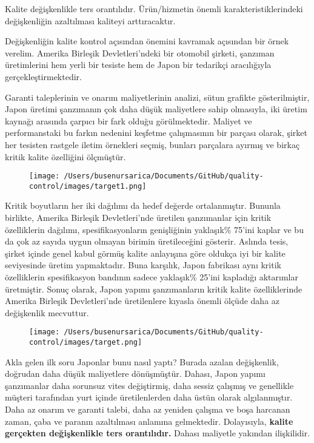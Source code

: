 \documentclass[
]{book}
\begin{document}
Kalite değişkenlikle ters orantılıdır. Ürün/hizmetin önemli karakteristiklerindeki değişkenliğin azaltılması kaliteyi arttıracaktır.

Değişkenliğin kalite kontrol açısından önemini kavramak açısından bir örnek verelim. Amerika Birleşik Devletleri'ndeki bir otomobil şirketi, şanzıman üretimlerini hem yerli bir tesiste hem de Japon bir tedarikçi aracılığıyla gerçekleştirmektedir.

Garanti taleplerinin ve onarım maliyetlerinin analizi, sütun grafikte gösterilmiştir, Japon üretimi şanzımanın çok daha düşük maliyetlere sahip olmasıyla, iki üretim kaynağı arasında çarpıcı bir fark olduğu görülmektedir. Maliyet ve performanstaki bu farkın nedenini keşfetme çalışmasının bir parçası olarak, şirket her tesisten rastgele iletim örnekleri seçmiş, bunları parçalara ayırmış ve birkaç kritik kalite özelliğini ölçmüştür.

\begin{figure}
\centering
\texttt{[image: /Users/busenursarica/Documents/GitHub/quality-control/images/target1.png]}
\end{figure}

Kritik boyutların her iki dağılımı da hedef değerde ortalanmıştır. Bununla birlikte, Amerika Birleşik Devletleri'nde üretilen şanzımanlar için kritik özelliklerin dağılımı, spesifikasyonların genişliğinin yaklaşık\% 75'ini kaplar ve bu da çok az sayıda uygun olmayan birimin üretileceğini gösterir. Aslında tesis, şirket içinde genel kabul görmüş kalite anlayışına göre oldukça iyi bir kalite seviyesinde üretim yapmaktadır. Buna karşılık, Japon fabrikası aynı kritik özelliklerin spesifikasyon bandının sadece yaklaşık\% 25'ini kapladığı aktarımlar üretmiştir. Sonuç olarak, Japon yapımı şanzımanların kritik kalite özelliklerinde Amerika Birleşik Devletleri'nde üretilenlere kıyasla önemli ölçüde daha az değişkenlik mecvuttur.


\begin{figure}
\centering
\texttt{[image: /Users/busenursarica/Documents/GitHub/quality-control/images/target.png]}
\end{figure}

Akla gelen ilk soru Japonlar bunu nasıl yaptı? Burada azalan değişkenlik, doğrudan daha düşük maliyetlere dönüşmüştür. Dahası, Japon yapımı şanzımanlar daha sorunsuz vites değiştirmiş, daha sessiz çalışmış ve genellikle müşteri tarafından yurt içinde üretilenlerden daha üstün olarak algılanmıştır. Daha az onarım ve garanti talebi, daha az yeniden çalışma ve boşa harcanan zaman, çaba ve paranın azaltılması anlamına gelmektedir. Dolayısıyla, \textbf{kalite gerçekten değişkenlikle ters orantılıdır.} Dahası maliyetle yakından ilişkilidir.
\end{document}
